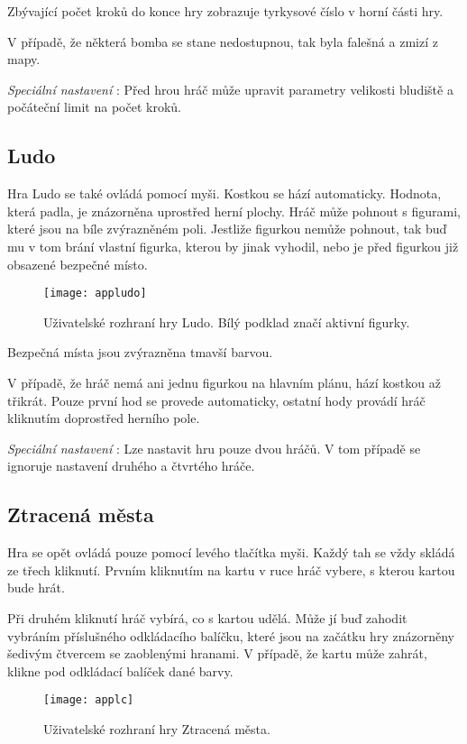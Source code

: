 Zbývající počet kroků do konce hry zobrazuje tyrkysové číslo v horní části hry. 

V případě, že některá bomba se stane nedostupnou, tak byla falešná a zmizí z mapy.

\emph{Speciální nastavení} : Před hrou hráč může upravit parametry velikosti bludiště a počáteční limit na počet kroků.

\subsection{Ludo}

Hra Ludo se také ovládá pomocí myši. Kostkou se hází automaticky. Hodnota, která padla, je znázorněna uprostřed herní plochy. Hráč může pohnout s figurami, které jsou na bíle zvýrazněném poli. Jestliže figurkou nemůže pohnout, tak buď mu v tom brání vlastní figurka, kterou by jinak vyhodil, nebo je před figurkou již obsazené bezpečné místo.

\begin{figure}
  \centering
  \texttt{[image: appludo]}
	\caption{Uživatelské rozhraní hry Ludo. Bílý podklad značí aktivní figurky. }
	\label{fig-appludo}
\end{figure}

Bezpečná místa jsou zvýrazněna tmavší barvou.

V případě, že hráč nemá ani jednu figurkou na hlavním plánu, hází kostkou až třikrát. Pouze první hod se provede automaticky, ostatní hody provádí hráč kliknutím doprostřed herního pole.

\emph{Speciální nastavení} : Lze nastavit hru pouze dvou hráčů. V tom případě se ignoruje nastavení druhého a čtvrtého hráče.

\subsection{Ztracená města}

Hra se opět ovládá pouze pomocí levého tlačítka myši. Každý tah se vždy skládá ze třech kliknutí. Prvním kliknutím na kartu v ruce hráč vybere, s kterou kartou bude hrát. 

Při druhém kliknutí hráč vybírá, co s kartou udělá. Může jí buď zahodit vybráním příslušného odkládacího balíčku, které jsou na začátku hry znázorněny šedivým čtvercem se zaoblenými hranami. V případě, že kartu může zahrát, klikne pod odkládací balíček dané barvy. 


\begin{figure}
  \centering
  \texttt{[image: applc]}
	\caption{Uživatelské rozhraní hry Ztracená města. }
	\label{fig-applc}
\end{figure}

